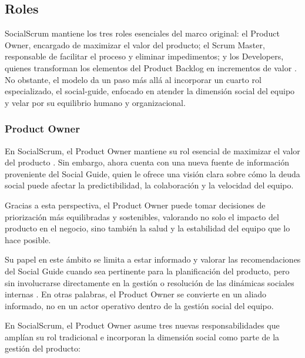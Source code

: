 \subsection{Roles}

SocialScrum mantiene los tres roles esenciales del marco original: el Product Owner, encargado de maximizar el valor del producto; el Scrum Master, responsable de facilitar el proceso y eliminar impedimentos; y los Developers, quienes transforman los elementos del Product Backlog en incrementos de valor \cite{schwaber2020scrum}.
No obstante, el modelo da un paso más allá al incorporar un cuarto rol especializado, el \gls{social-guide}, enfocado en atender la dimensión social del equipo y velar por su equilibrio humano y organizacional.

\subsubsection{Product Owner}

En SocialScrum, el Product Owner mantiene su rol esencial de maximizar el valor del producto \cite{schwaber2020scrum}. Sin embargo, ahora cuenta con una nueva fuente de información proveniente del Social Guide, quien le ofrece una visión clara sobre cómo la deuda social puede afectar la predictibilidad, la colaboración y la velocidad del equipo.

Gracias a esta perspectiva, el Product Owner puede tomar decisiones de priorización más equilibradas y sostenibles, valorando no solo el impacto del producto en el negocio, sino también la salud y la estabilidad del equipo que lo hace posible.

Su papel en este ámbito se limita a estar informado y valorar las recomendaciones del Social Guide cuando sea pertinente para la planificación del producto, pero sin involucrarse directamente en la gestión o resolución de las dinámicas sociales internas \cite{saeeda2024nontechnicaldebt}.
En otras palabras, el Product Owner se convierte en un aliado informado, no en un actor operativo dentro de la gestión social del equipo.

En SocialScrum, el Product Owner asume tres nuevas responsabilidades que amplían su rol tradicional e incorporan la dimensión social como parte de la gestión del producto:

